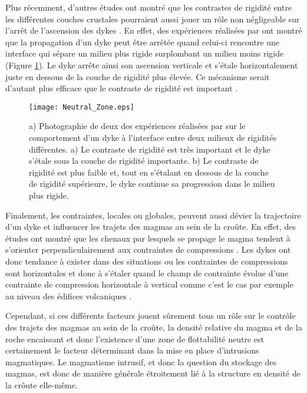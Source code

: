 Plus  récemment, d'autres  études  ont montré  que  les contrastes  de
rigidité  entre les  différentes  couches  crustales pourraient  aussi
jouer un  rôle non  négligeable sur l'arrêt  de l'ascension  des dykes
\citep{Menand:2011ki}.   En  effet,   des  expériences  réalisées  par
\citet{Kavanagh:2006ig} ont  montré que la propagation  d'un dyke peut
être  arrêtée quand  celui-ci rencontre  une interface  qui sépare  un
milieu  plus  rigide  surplombant   un  milieu  moins  rigide  (Figure
\ref{Neutral_Zone}). Le  dyke arrête ainsi son  ascension verticale et
s'étale horizontalement juste en dessous de la couche de rigidité plus
élevée. Ce mécanisme serait d'autant plus efficace que le contraste de
rigidité est important \citep{Kavanagh:2006ig}.

\begin{figure}[htpb]
  \begin{center}
    \graphicspath{ {/Users/thorey/Documents/These/Manuscript/Figure/Chapter1/} }
    \texttt{[image: Neutral\_Zone.eps]}
    \caption{a)  Photographie de  deux des  expériences réalisées  par
      \citet{Kavanagh:2006ig}   sur  le   comportement  d'un   dyke  à
      l'interface entre  deux milieux de rigidités  différentes. a) Le
      contraste de rigidité est très important et le dyke s'étale sous
      la couche de  rigidité importante.  b) Le  contraste de rigidité
      est plus faible et, tout en s'étalant en dessous de la couche de
      rigidité  supérieure, le  dyke  continue sa  progression dans  le
      milieu plus rigide.}
    \label{Neutral_Zone}
  \end{center}
\end{figure}


Finalement, les contraintes, locales ou globales, peuvent aussi dévier
la trajectoire d'un dyke et influencer  les trajets des magmas au sein
de la  croûte.  En effet,  des études ont  montré que les  chenaux par
lesquels se propage le  magma tendent à s'orienter perpendiculairement
aux contraintes de  compressions \citep{Anderson:L5JA3dNN}.  Les dykes
ont donc tendance à exister dans  des situations ou les contraintes de
compressions sont  horizontales et donc  à s'étaler quand le  champ de
contrainte  évolue  d'une  contrainte   de  compression  horizontale  à
vertical  comme  c'est le  cas  par  exemple  au niveau  des  édifices
volcaniques \citep{Pinel:2000wa,Pinel:2004ji,Roman:2014hw}.

Cependant, si ces différents facteurs jouent sûrement tous un rôle sur
le contrôle  des trajets des magmas  au sein de la  croûte, la densité
relative du magma et de la  roche encaissant et donc l'existence d'une
zone de  flottabilité neutre  est certainement le  facteur déterminant
dans  la  mise  en  place  d'intrusions  magmatiques.   Le  magmatisme
intrusif, et  donc la  question du  stockage des  magmas, est  donc de
manière  générale étroitement  lié à  la  structure en  densité de  la
crôute elle-même.


